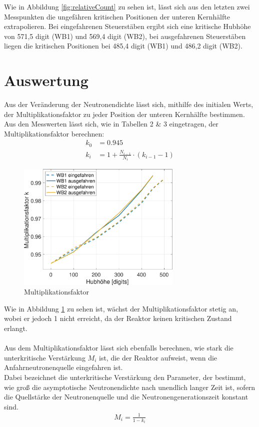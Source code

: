 \documentclass[12pt,german]{article}
\begin{document}
    Wie in Abbildung \ref{fig:relativeCount} zu sehen ist, lässt sich aus den letzten zwei Messpunkten die ungefähren kritischen Positionen der unteren Kernhälfte extrapolieren.
    Bei eingefahrenen Steuerstäben ergibt sich eine kritische Hubhöhe von 571,5 digit (WB1) und 569,4 digit (WB2), bei ausgefahrenen Steuerstäben liegen die kritischen Positionen bei 485,4 digit (WB1) und 486,2 digit (WB2).

    \section{Auswertung}


    Aus der Veränderung der Neutronendichte lässt sich, mithilfe des initialen Werts, der Multiplikationsfaktor zu jeder Position der unteren Kernhälfte bestimmen. \\
    Aus den Messwerten lässt sich, wie in Tabellen 2 \& 3 eingetragen, der Multiplikationsfaktor berechnen:
    \begin{align*}
        k_0 &= 0.945 \\
        k_i &= 1 + \frac{N_{i-1}}{N_i} \cdot \left(k_{i-1} - 1\right)
    \end{align*}
    
    \begin{figure}[H]
        \centering
        \includegraphics[width=0.7\textwidth]{multiplikationsfaktor.png}
        \caption{Multiplikationsfaktor}
        \label{fig:multFaktor}
    \end{figure}
    Wie in Abbildung \ref{fig:multFaktor} zu sehen ist, wächst der Multiplikationsfaktor stetig an, wobei er jedoch 1 nicht erreicht, da der Reaktor keinen kritischen Zustand erlangt.
    \\ \\
    Aus dem Multiplikationsfaktor lässt sich ebenfalls berechnen, wie stark die unterkritische Verstärkung $M_i$ ist, die der Reaktor aufweist, wenn die Anfahrneutronenquelle eingefahren ist. \\
    Dabei bezeichnet die unterkritische Verstärkung den Parameter, der bestimmt, wie groß die asymptotische Neutronendichte nach unendlich langer Zeit ist, sofern die Quellstärke der Neutronenquelle und die Neutronengenerationszeit konstant sind.
    \begin{align*}
        M_i = \frac{1}{1 - k_i}
    \end{align*}
\end{document}
